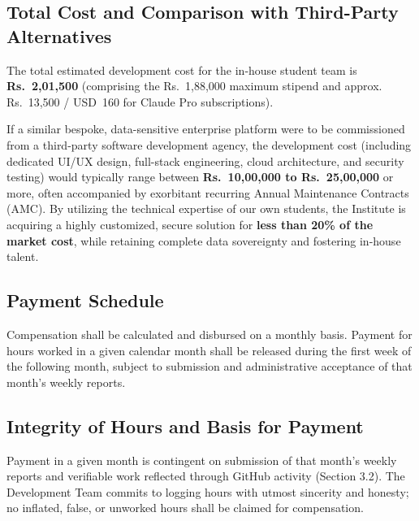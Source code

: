 \documentclass[11pt]{article}
\begin{document}
\subsection{Total Cost and Comparison with Third-Party Alternatives}
The total estimated development cost for the in-house student team is \textbf{Rs.~2,01,500} (comprising the Rs.~1,88,000 maximum stipend and approx. Rs.~13,500 / USD~160 for Claude Pro subscriptions).

If a similar bespoke, data-sensitive enterprise platform were to be commissioned from a third-party software development agency, the development cost (including dedicated UI/UX design, full-stack engineering, cloud architecture, and security testing) would typically range between \textbf{Rs.~10,00,000 to Rs.~25,00,000} or more, often accompanied by exorbitant recurring Annual Maintenance Contracts (AMC). By utilizing the technical expertise of our own students, the Institute is acquiring a highly customized, secure solution for \textbf{less than 20\% of the market cost}, while retaining complete data sovereignty and fostering in-house talent.


\subsection{Payment Schedule}
Compensation shall be calculated and disbursed on a monthly basis. Payment for hours worked in a given calendar month shall be released during the first week of the following month, subject to submission and administrative acceptance of that month's weekly reports.

\subsection{Integrity of Hours and Basis for Payment}
Payment in a given month is contingent on submission of that month's weekly reports and verifiable work reflected through GitHub activity (Section 3.2). The Development Team commits to logging hours with utmost sincerity and honesty; no inflated, false, or unworked hours shall be claimed for compensation.
\end{document}
